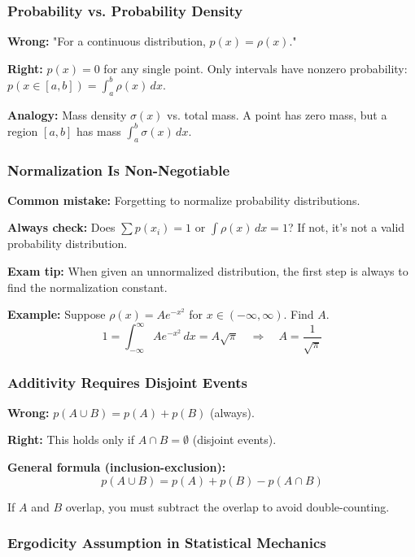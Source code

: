 \documentclass[9pt,twocoloumn]{article}
\begin{document}
\subsubsection{Probability vs. Probability Density}

\textbf{Wrong:} "For a continuous distribution, $p(x) = \rho(x)$."

\textbf{Right:} $p(x) = 0$ for any single point. Only intervals have nonzero probability: $p(x \in [a, b]) = \int_a^b \rho(x) \, dx$.

\textbf{Analogy:} Mass density $\sigma(x)$ vs. total mass. A point has zero mass, but a region $[a, b]$ has mass $\int_a^b \sigma(x) \, dx$.

\subsubsection{Normalization Is Non-Negotiable}

\textbf{Common mistake:} Forgetting to normalize probability distributions.

\textbf{Always check:} Does $\sum p(x_i) = 1$ or $\int \rho(x) \, dx = 1$? If not, it's not a valid probability distribution.

\textbf{Exam tip:} When given an unnormalized distribution, the first step is always to find the normalization constant.

\textbf{Example:} Suppose $\rho(x) = A e^{-x^2}$ for $x \in (-\infty, \infty)$. Find $A$.
\begin{equation}
1 = \int_{-\infty}^\infty A e^{-x^2} \, dx = A \sqrt{\pi} \quad \Rightarrow \quad A = \frac{1}{\sqrt{\pi}}
\end{equation}

\subsubsection{Additivity Requires Disjoint Events}

\textbf{Wrong:} $p(A \cup B) = p(A) + p(B)$ (always).

\textbf{Right:} This holds only if $A \cap B = \emptyset$ (disjoint events).

\textbf{General formula (inclusion-exclusion):}
\begin{equation}
p(A \cup B) = p(A) + p(B) - p(A \cap B)
\end{equation}

If $A$ and $B$ overlap, you must subtract the overlap to avoid double-counting.

\subsubsection{Ergodicity Assumption in Statistical Mechanics}
\end{document}

